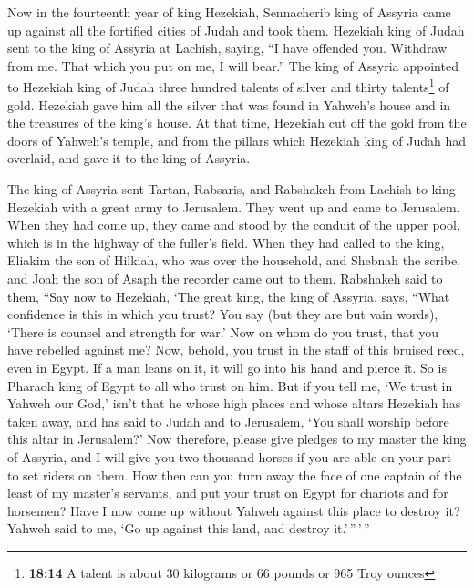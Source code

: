  Now in the fourteenth year of king Hezekiah, Sennacherib
king of Assyria came up against all the fortified cities of Judah and
took them.  Hezekiah king of Judah sent to the king of
Assyria at Lachish, saying, ``I have offended you. Withdraw from me.
That which you put on me, I will bear.'' The king of Assyria appointed
to Hezekiah king of Judah three hundred talents of silver and thirty
talents\footnote{\textbf{18:14} A talent is about 30 kilograms or 66
  pounds or 965 Troy ounces} of gold.  Hezekiah gave him
all the silver that was found in Yahweh's house and in the treasures of
the king's house.  At that time, Hezekiah cut off the
gold from the doors of Yahweh's temple, and from the pillars which
Hezekiah king of Judah had overlaid, and gave it to the king of Assyria.

 The king of Assyria sent Tartan, Rabsaris, and Rabshakeh
from Lachish to king Hezekiah with a great army to Jerusalem. They went
up and came to Jerusalem. When they had come up, they came and stood by
the conduit of the upper pool, which is in the highway of the fuller's
field.  When they had called to the king, Eliakim the son
of Hilkiah, who was over the household, and Shebnah the scribe, and Joah
the son of Asaph the recorder came out to them. 
Rabshakeh said to them, ``Say now to Hezekiah, `The great king, the king
of Assyria, says, ``What confidence is this in which you trust?
 You say (but they are but vain words), `There is counsel
and strength for war.' Now on whom do you trust, that you have rebelled
against me?  Now, behold, you trust in the staff of this
bruised reed, even in Egypt. If a man leans on it, it will go into his
hand and pierce it. So is Pharaoh king of Egypt to all who trust on him.
 But if you tell me, `We trust in Yahweh our God,' isn't
that he whose high places and whose altars Hezekiah has taken away, and
has said to Judah and to Jerusalem, `You shall worship before this altar
in Jerusalem?'  Now therefore, please give pledges to my
master the king of Assyria, and I will give you two thousand horses if
you are able on your part to set riders on them.  How
then can you turn away the face of one captain of the least of my
master's servants, and put your trust on Egypt for chariots and for
horsemen?  Have I now come up without Yahweh against this
place to destroy it? Yahweh said to me, `Go up against this land, and
destroy it.'\,''\,'\,''

